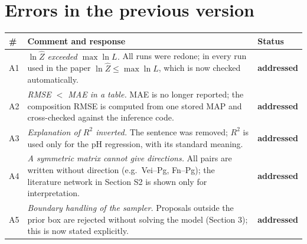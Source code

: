 \documentclass[11pt,a4paper]{article}
\newcommand{\done}{\textcolor{green!45!black}{\textbf{addressed}}}
\begin{document}
\section*{Errors in the previous version}
\begin{tabularx}{\textwidth}{@{}l Y l@{}}
\toprule
\# & Comment and response & Status\\
\midrule
A1 & \emph{$\ln\hat Z$ exceeded $\max\ln L$.} All runs were redone; in every run used in the paper $\ln\hat Z\le\max\ln L$, which is now checked automatically. & \done\\
A2 & \emph{RMSE $<$ MAE in a table.} MAE is no longer reported; the composition RMSE is computed from one stored MAP and cross-checked against the inference code. & \done\\
A3 & \emph{Explanation of $R^2$ inverted.} The sentence was removed; $R^2$ is used only for the pH regression, with its standard meaning. & \done\\
A4 & \emph{A symmetric matrix cannot give directions.} All pairs are written without direction (e.g.\ Vei--Pg, Fn--Pg); the literature network in Section S2 is shown only for interpretation. & \done\\
A5 & \emph{Boundary handling of the sampler.} Proposals outside the prior box are rejected without solving the model (Section 3); this is now stated explicitly. & \done\\
\bottomrule
\end{tabularx}
\end{document}
